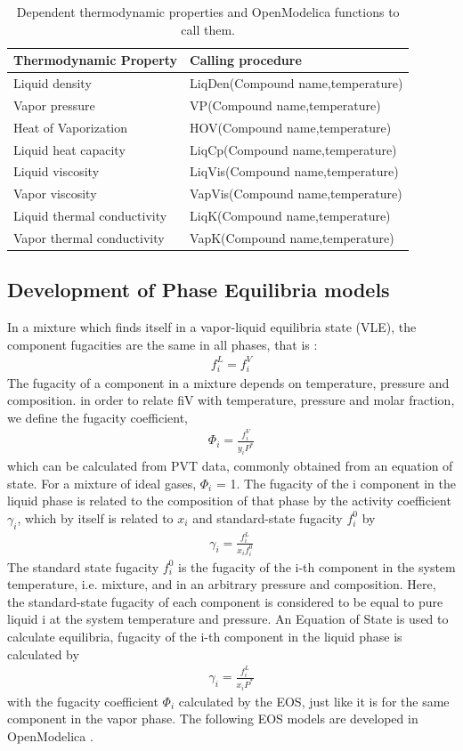 \documentclass[12pt]{report}
\begin{document}
\begin{table}
\centering
\caption {Dependent thermodynamic properties and OpenModelica functions to call them.}
\label{tab:depprop}
\vspace{1ex}
\begin{tabular}{l|l} \hline
Thermodynamic Property & Calling procedure \\ \hline
Liquid density & LiqDen(Compound name,temperature) \\
Vapor pressure & VP(Compound name,temperature) \\
Heat of Vaporization & HOV(Compound name,temperature) \\
Liquid heat capacity & LiqCp(Compound name,temperature) \\
Liquid viscosity & LiqVis(Compound name,temperature) \\
Vapor viscosity & VapVis(Compound name,temperature) \\
Liquid thermal conductivity & LiqK(Compound name,temperature) \\
Vapor thermal conductivity & VapK(Compound name,temperature) \\ \hline
\end{tabular}
\end{table}

\subsection{Development of Phase Equilibria models}
In a mixture which finds itself in a vapor-liquid equilibria state (VLE), the component fugacities are the same in all phases, that is :
\begin{align*}
f_i^L = f_i^V 
\end{align*}
The fugacity of a component in a mixture depends on temperature, pressure and composition. in order to relate fiV with temperature, pressure and molar fraction, we define the fugacity coefficient,
\begin{align*}
\Phi_i = \frac{f_i^V}{y_iP^*}
\end{align*}
which can be calculated from PVT data, commonly obtained from an equation of state. For a mixture of ideal gases, $\Phi_i$ = 1.
The fugacity of the i component in the liquid phase is related to the composition of that phase by the activity coefficient $\gamma_i$, which by itself is related to $x_i$ and standard-state fugacity $f_i^0$ by
\begin{align*}
\gamma_i = \frac{f_i^L}{x_if_i^0}
\end{align*}
The standard state fugacity $f_i^0$ is the fugacity of the i-th component in the system temperature, i.e. mixture, and in an arbitrary pressure and composition. Here, the standard-state fugacity of each component is considered to be equal to pure liquid i at the system temperature and pressure. An Equation of State is used to calculate equilibria, fugacity of the i-th component in the liquid phase is calculated by
\begin{align*}
\gamma_i = \frac{f_i^L}{x_iP^*}
\end{align*}
with the fugacity coefficient $\Phi_i$ calculated by the EOS, just like it is for the same component in the vapor phase.
The following EOS models are developed in OpenModelica \cite{DWSIM}.
\end{document}
